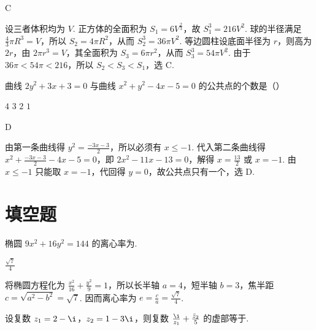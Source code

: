 \documentclass[UTF8,a4paper,oneside,11pt]{ctexbook}
\begin{document}
\begin{answer}
C
\end{answer}

\begin{solution}
设三者体积均为 \(V\). 正方体的全面积为 \(S_1=6V^{\frac{2}{3}}\)，故 \(S_1^3=216V^2\). 球的半径满足 \(\frac{4}{3}\pi R^3=V\)，所以 \(S_2=4\pi R^2\)，从而 \(S_2^3=36\pi V^2\). 等边圆柱设底面半径为 \(r\)，则高为 \(2r\)，由 \(2\pi r^3=V\)，其全面积为 \(S_3=6\pi r^2\)，从而 \(S_3^3=54\pi V^2\). 由于 \(36\pi<54\pi<216\)，所以 \(S_2<S_3<S_1\)，选 C.
\end{solution}

\begin{problem}
曲线 \(2y^2+3x+3=0\) 与曲线 \(x^2+y^2-4x-5=0\) 的公共点的个数是（\quad）

\choices
    {\(4\)}
    {\(3\)}
    {\(2\)}
    {\(1\)}

\end{problem}

\begin{answer}
D
\end{answer}

\begin{solution}
由第一条曲线得 \(y^2=\frac{-3x-3}{2}\)，所以必须有 \(x\leqslant-1\). 代入第二条曲线得 \(x^2+\frac{-3x-3}{2}-4x-5=0\)，即 \(2x^2-11x-13=0\)，解得 \(x=\frac{13}{2}\) 或 \(x=-1\). 由 \(x\leqslant-1\) 只能取 \(x=-1\)，代回得 \(y=0\)，故公共点只有一个，选 D.
\end{solution}

\section{填空题}

\begin{problem}
椭圆 \(9x^2+16y^2=144\) 的离心率为\fillinblank{}.
\end{problem}

\begin{answer}
\(\frac{\sqrt{7}}{4}\)
\end{answer}

\begin{solution}
将椭圆方程化为 \(\frac{x^2}{16}+\frac{y^2}{9}=1\)，所以长半轴 \(a=4\)，短半轴 \(b=3\)，焦半距 \(c=\sqrt{a^2-b^2}=\sqrt{7}\). 因而离心率为 \(e=\frac{c}{a}=\frac{\sqrt{7}}{4}\).
\end{solution}

\begin{problem}
设复数 \(z_1=2-\i\)，\(z_2=1-3\i\)，则复数 \(\frac{\i}{z_1}+\frac{\bar{z}_2}{5}\) 的虚部等于\fillinblank{}.
\end{problem}
\end{document}
